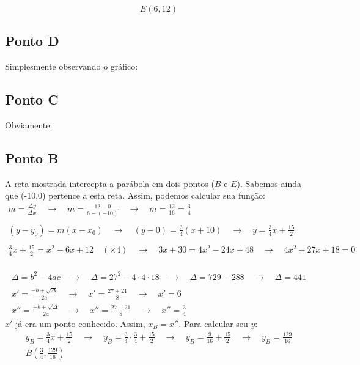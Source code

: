 \documentclass[a4paper,12pt,final]{article}
\begin{document}
$$\boxed{E(6,12)}$$

\subsection*{Ponto D}
Simplesmente observando o gráfico:

\subsection*{Ponto C}
Obviamente: 

\subsection*{Ponto B}
A reta mostrada intercepta a parábola em dois pontos ($B$ e $E$). Sabemos ainda que (-10,0) pertence a esta reta. Assim, podemos calcular sua função:
\begin{gather*}
m = \frac{\Delta y}{\Delta x}\quad\rightarrow\quad
m = \frac{12 - 0}{6 - (-10)}\quad\rightarrow\quad
m = \frac{12}{16} = \boxed{\frac{3}{4}}\\\\
(y - y_0) = m(x - x_0)\quad\rightarrow\quad
(y - 0) = \frac{3}{4}(x + 10)\quad\rightarrow\quad
\boxed{y = \frac{3}{4}x + \frac{15}{2}}\\
\\
\frac{3}{4}x + \frac{15}{2} = x^2 - 6x + 12\quad(\times 4)\quad\rightarrow\quad
3x + 30 = 4x^2 - 24x + 48\quad\rightarrow\quad
\boxed{4x^2 - 27x +18 = 0}\\
\end{gather*}

\newpage

\begin{gather*}
\Delta = b^2 - 4ac\quad\rightarrow\quad
\Delta = 27^2 - 4\cdot 4\cdot 18\quad\rightarrow\quad
\Delta = 729 - 288\quad\rightarrow\quad
\Delta = 441\\\\
x' = \frac{-b + \sqrt{\Delta}}{2a}\quad\rightarrow\quad
x' = \frac{27 + 21}{8}\quad\rightarrow\quad
\boxed{x' = 6}\\
x'' = \frac{-b + \sqrt{\Delta}}{2a}\quad\rightarrow\quad
x'' = \frac{27 - 21}{8}\quad\rightarrow\quad
\boxed{x'' = \frac{3}{4}}
\end{gather*}
$x'$ já era um ponto conhecido. Assim, $x_B = x''$. Para calcular seu $y$:
\begin{gather*}
y_B = \frac{3}{4}x + \frac{15}{2}\quad\rightarrow\quad
y_B = \frac{3}{4}\cdot\frac{3}{4} + \frac{15}{2}\quad\rightarrow\quad
y_B = \frac{9}{16} + \frac{15}{2}\quad\rightarrow\quad
\boxed{y_B = \frac{129}{16}}\\
\boxed{B\left(\frac{3}{4},\frac{129}{16}\right)}
\end{gather*}
\end{document}
